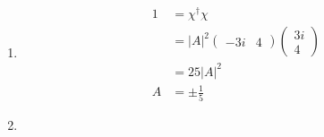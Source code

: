 \documentclass{article}
\begin{document}
\begin{enumerate}
  \item

        \begin{align*}
          1 & = \chi^\dagger \chi                  \\
            & = |A|^2 \begin{pmatrix}
                        -3 i & 4
                      \end{pmatrix} \begin{pmatrix}
                                      3 i \\
                                      4
                                    \end{pmatrix} \\
            & = 25 |A|^2                           \\
          A & = \pm \frac{1}{5}
        \end{align*}

  \item


\end{enumerate}
\end{document}
